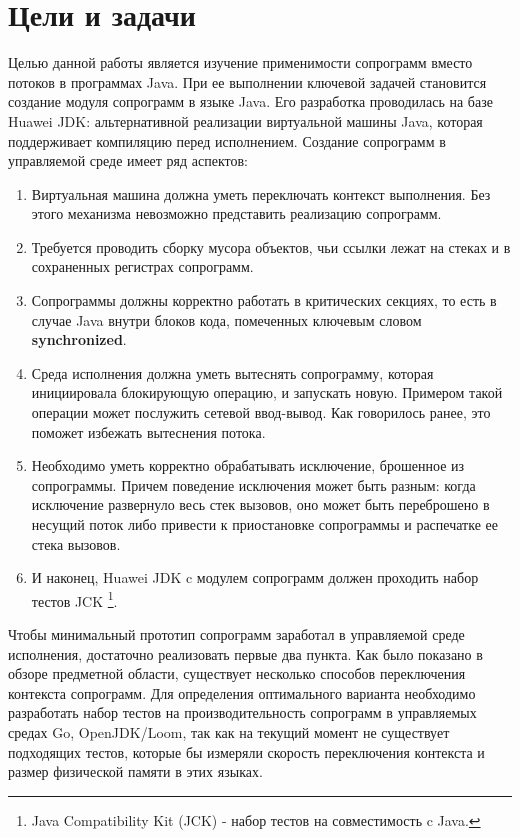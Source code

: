 \section{Цели и задачи}
	Целью данной работы является изучение применимости сопрограмм вместо потоков в программах Java. При ее выполнении ключевой задачей становится создание модуля 
	сопрограмм в языке Java.
	Его разработка проводилась на базе Huawei JDK: альтернативной реализации виртуальной машины Java, которая поддерживает компиляцию перед исполнением. 
	Создание сопрограмм в управляемой среде имеет ряд аспектов: 
	\begin{enumerate}[align=left]
		\item Виртуальная машина должна уметь переключать контекст выполнения. Без этого механизма невозможно представить реализацию сопрограмм.
		\item Требуется проводить сборку мусора объектов, чьи ссылки лежат на стеках и в сохраненных регистрах сопрограмм. 
		\item Сопрограммы должны корректно работать в критических секциях, то есть в случае Java внутри блоков кода, помеченных ключевым словом \textbf{synchronized}.
		\item Среда исполнения должна уметь вытеснять сопрограмму, которая инициировала
		блокирующую операцию, и запускать новую. Примером такой операции может послужить
		сетевой ввод-вывод. Как говорилось ранее, это поможет избежать вытеснения потока.
		\item Необходимо уметь корректно обрабатывать исключение, брошенное из сопрограммы. Причем поведение 
		исключения может быть разным: когда исключение
		развернуло весь стек вызовов, оно может быть переброшено в
		несущий поток либо привести к приостановке сопрограммы и распечатке ее стека вызовов.
		\item И наконец, Huawei JDK c модулем сопрограмм должен проходить набор тестов JCK
		\footnote{Java Compatibility Kit (JCK) - набор тестов на совместимость c Java.}.
	\end{enumerate}
	Чтобы минимальный прототип сопрограмм заработал в управляемой среде исполнения, достаточно реализовать первые 
	два пункта. Как было показано в обзоре предметной области, существует несколько способов
	переключения контекста сопрограмм. Для определения оптимального варианта необходимо разработать 
	набор тестов на производительность сопрограмм в управляемых средах Go, OpenJDK/Loom, 
	так как на текущий момент не существует подходящих тестов, которые бы измеряли скорость 
	переключения контекста и размер физической памяти в этих языках.
